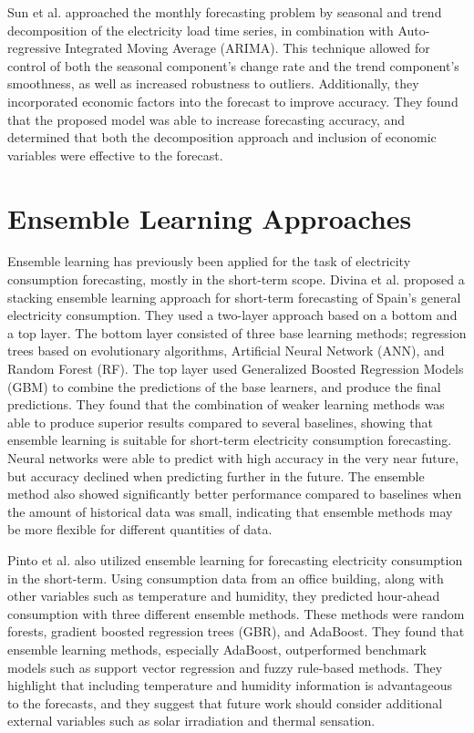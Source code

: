 Sun et al. \cite{sun_monthly_2019} approached the monthly forecasting problem by seasonal and trend decomposition of the electricity load time series, in combination with Auto-regressive Integrated Moving Average (ARIMA). This technique allowed for control of both the seasonal component's change rate and the trend component's smoothness, as well as increased robustness to outliers. Additionally, they incorporated economic factors into the forecast to improve accuracy. They found that the proposed model was able to increase forecasting accuracy, and determined that both the decomposition approach and inclusion of economic variables were effective to the forecast.

\section{Ensemble Learning Approaches}

Ensemble learning has previously been applied for the task of electricity consumption forecasting, mostly in the short-term scope. Divina et al. \cite{divina_stacking_2018} proposed a stacking ensemble learning approach for short-term  forecasting of Spain's general electricity consumption. They used a two-layer approach based on a bottom and a top layer. The bottom layer consisted of three base learning methods; regression trees based on evolutionary algorithms, Artificial Neural Network (ANN), and Random Forest (RF). The top layer used Generalized Boosted Regression Models (GBM) to combine the predictions of the base learners, and produce the final predictions. They found that the combination of weaker learning methods was able to produce superior results compared to several baselines, showing that ensemble learning is suitable for short-term electricity consumption forecasting. Neural networks were able to predict with high accuracy in the very near future, but accuracy declined when predicting further in the future. The ensemble method also showed significantly better performance compared to baselines when the amount of historical data was small, indicating that ensemble methods may be more flexible for different quantities of data.

Pinto et al. \cite{pinto_ensemble_2021} also utilized ensemble learning for forecasting electricity consumption in the short-term. Using consumption data from an office building, along with other variables such as temperature and humidity, they predicted hour-ahead consumption with three different ensemble methods. These methods were random forests, gradient boosted regression trees (GBR), and AdaBoost. They found that ensemble learning methods, especially AdaBoost, outperformed benchmark models such as support vector regression and fuzzy rule-based methods. They highlight that including temperature and humidity information is advantageous to the forecasts, and they suggest that future work should consider additional external variables such as solar irradiation and thermal sensation.

